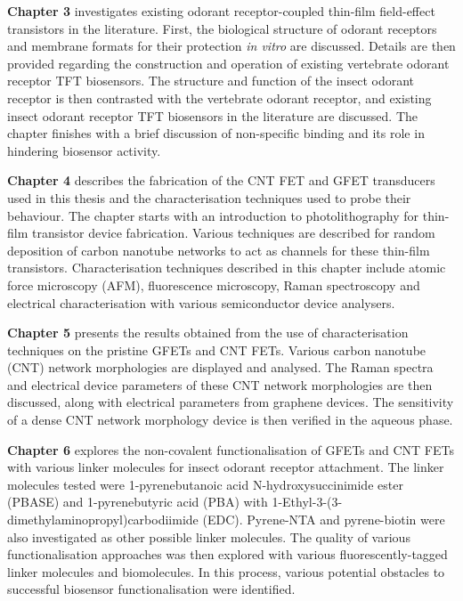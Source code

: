 \documentclass[
  a4paper,
]{scrbook}
\begin{document}
\textbf{Chapter 3} investigates existing odorant receptor-coupled
thin-film field-effect transistors in the literature. First, the
biological structure of odorant receptors and membrane formats for their
protection \emph{in vitro} are discussed. Details are then provided
regarding the construction and operation of existing vertebrate odorant
receptor TFT biosensors. The structure and function of the insect
odorant receptor is then contrasted with the vertebrate odorant
receptor, and existing insect odorant receptor TFT biosensors in the
literature are discussed. The chapter finishes with a brief discussion
of non-specific binding and its role in hindering biosensor activity.

\textbf{Chapter 4} describes the fabrication of the CNT FET and GFET
transducers used in this thesis and the characterisation techniques used
to probe their behaviour. The chapter starts with an introduction to
photolithography for thin-film transistor device fabrication. Various
techniques are described for random deposition of carbon nanotube
networks to act as channels for these thin-film transistors.
Characterisation techniques described in this chapter include atomic
force microscopy (AFM), fluorescence microscopy, Raman spectroscopy and
electrical characterisation with various semiconductor device analysers.

\textbf{Chapter 5} presents the results obtained from the use of
characterisation techniques on the pristine GFETs and CNT FETs. Various
carbon nanotube (CNT) network morphologies are displayed and analysed.
The Raman spectra and electrical device parameters of these CNT network
morphologies are then discussed, along with electrical parameters from
graphene devices. The sensitivity of a dense CNT network morphology
device is then verified in the aqueous phase.

\textbf{Chapter 6} explores the non-covalent functionalisation of GFETs
and CNT FETs with various linker molecules for insect odorant receptor
attachment. The linker molecules tested were 1-pyrenebutanoic acid
N-hydroxysuccinimide ester (PBASE) and 1-pyrenebutyric acid (PBA) with
1-Ethyl-3-(3-dimethylaminopropyl)carbodiimide (EDC). Pyrene-NTA and
pyrene-biotin were also investigated as other possible linker molecules.
The quality of various functionalisation approaches was then explored
with various fluorescently-tagged linker molecules and biomolecules. In
this process, various potential obstacles to successful biosensor
functionalisation were identified.
\end{document}
